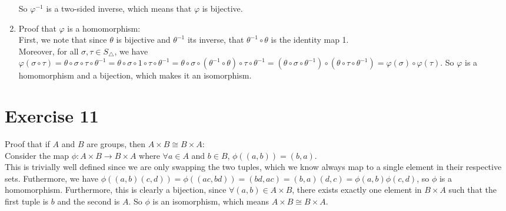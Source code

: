 \documentclass{article}
\begin{document}
\begin{enumerate}[label=\textbf{\alph*.}]
            So $\varphi^{-1}$ is a two-sided inverse,
            which means that $\varphi$ is bijective.
        \item
            Proof that $\varphi$ is a homomorphism: \\
            First, we note that since $\theta$ is bijective
            and $\theta^{-1}$ its inverse,
            that $\theta^{-1} \circ \theta$ is the identity map 1. \\
            Moreover, for all $\sigma, \tau \in S_\triangle$,
            we have $\varphi(\sigma \circ \tau)
            = \theta \circ \sigma \circ \tau \circ \theta^{-1}
            = \theta \circ \sigma \circ 1 \circ \tau \circ \theta^{-1}
            = \theta \circ \sigma \circ (\theta^{-1} \circ \theta) \circ \tau
            \circ \theta^{-1}
            = (\theta \circ \sigma \circ \theta^{-1}) \circ (\theta \circ
            \tau \circ \theta^{-1})
            = \varphi(\sigma) \circ \varphi(\tau)$.
            So $\varphi$ is a homomorphism and a bijection,
            which makes it an isomorphism.
    \end{enumerate}


    \section*{Exercise 11}
    Proof that if $A$ and $B$ are groups,
    then $A \times B \cong B \times A$: \\
    Consider the map $\phi: A \times B \to B \times A$
    where $\forall a\in A$ and $b \in B$, $\phi((a, b)) = (b, a)$. \\
    This is trivially well defined since we are only swapping the two tuples,
    which we know always map to a single element in their respective sets.
    Futhermore, we have $\phi((a, b)(c, d)) = \phi((ac, bd))
    = (bd, ac) = (b, a)(d, c) = \phi(a, b)\phi(c, d)$,
    so $\phi$ is a homomorphism.
    Furthermore, this is clearly a bijection,
    since $\forall (a, b) \in A \times B$,
    there exists exactly one element in $B \times A$
    such that the first tuple is $b$ and the second is $A$.
    So $\phi$ is an isomorphism,
    which means  $A \times B \cong B \times A$.
\end{document}
